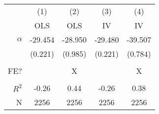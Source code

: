 \begin{tabular}{r|cccc}
 & (1) & (2) & (3) & (4) \\ 
& OLS & OLS & IV & IV \\\hline 
$\alpha$ & -29.454 & -28.950  & -29.480  & -39.507 \\ 
& (0.221) & (0.985) & (0.221) & (0.784) \\ 
 &&&& \\ 
FE? & & X & & X \\ 
 &&&& \\ 
$R^2$ & -0.26 & 0.44 & -0.26 & 0.38 \\
N & 2256 & 2256 & 2256 & 2256 \\\hline 
\end{tabular}